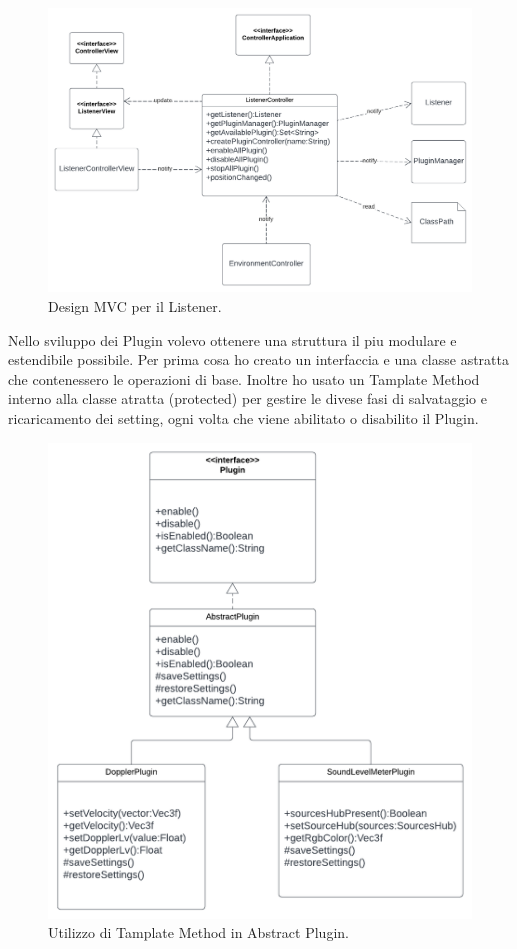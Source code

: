 \documentclass[a4paper,12pt]{report}
\begin{document}
\begin{figure}[H]
\centering{}
\includegraphics[width=\textwidth]{img/listener/ListenerMVC.png}
\caption{Design MVC per il Listener.}
\label{img:Listener}
\end{figure}
%
Nello sviluppo dei Plugin volevo ottenere una struttura il piu modulare e estendibile possibile. Per prima cosa ho creato un interfaccia e una classe astratta che contenessero le operazioni di base. Inoltre ho usato un Tamplate Method interno alla classe atratta (protected) per gestire le divese fasi di salvataggio e ricaricamento dei setting, ogni volta che viene abilitato o disabilito il Plugin.
\begin{figure}[H]
\centering{}
\includegraphics[width=\textwidth]{img/listener/Plugin.png}
\caption{Utilizzo di Tamplate Method in Abstract Plugin.}
\label{img:Listener}
\end{figure}
\end{document}
